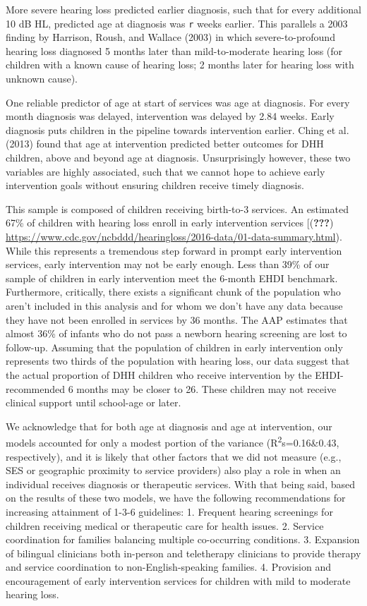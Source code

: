 \documentclass[english,man]{apa6}
\begin{document}
More severe hearing loss predicted earlier diagnosis, such that for every additional 10 dB HL, predicted age at diagnosis was \texttt{r} weeks earlier. This parallels a 2003 finding by Harrison, Roush, and Wallace (2003) in which severe-to-profound hearing loss diagnosed 5 months later than mild-to-moderate hearing loss (for children with a known cause of hearing loss; 2 months later for hearing loss with unknown cause).

One reliable predictor of age at start of services was age at diagnosis. For every month diagnosis was delayed, intervention was delayed by 2.84 weeks. Early diagnosis puts children in the pipeline towards intervention earlier. Ching et al. (2013) found that age at intervention predicted better outcomes for DHH children, above and beyond age at diagnosis. Unsurprisingly however, these two variables are highly associated, such that we cannot hope to achieve early intervention goals without ensuring children receive timely diagnosis.

This sample is composed of children receiving birth-to-3 services. An estimated 67\% of children with hearing loss enroll in early intervention services {[}({\textbf{???}}) \url{https://www.cdc.gov/ncbddd/hearingloss/2016-data/01-data-summary.html}). While this represents a tremendous step forward in prompt early intervention services, early intervention may not be early enough. Less than 39\% of our sample of children in early intervention meet the 6-month EHDI benchmark. Furthermore, critically, there exists a significant chunk of the population who aren't included in this analysis and for whom we don't have any data because they have not been enrolled in services by 36 months. The AAP estimates that almost 36\% of infants who do not pass a newborn hearing screening are lost to follow-up. Assuming that the population of children in early intervention only represents two thirds of the population with hearing loss, our data suggest that the actual proportion of DHH children who receive intervention by the EHDI-recommended 6 months may be closer to 26. These children may not receive clinical support until school-age or later.

We acknowledge that for both age at diagnosis and age at intervention, our models accounted for only a modest portion of the variance (R\textsuperscript{2}s=0.16\&0.43, respectively), and it is likely that other factors that we did not measure (e.g., SES or geographic proximity to service providers) also play a role in when an individual receives diagnosis or therapeutic services. With that being said, based on the results of these two models, we have the following recommendations for increasing attainment of 1-3-6 guidelines:
1. Frequent hearing screenings for children receiving medical or therapeutic care for health issues.
2. Service coordination for families balancing multiple co-occurring conditions.
3. Expansion of bilingual clinicians both in-person and teletherapy clinicians to provide therapy and service coordination to non-English-speaking families.
4. Provision and encouragement of early intervention services for children with mild to moderate hearing loss.
\end{document}
